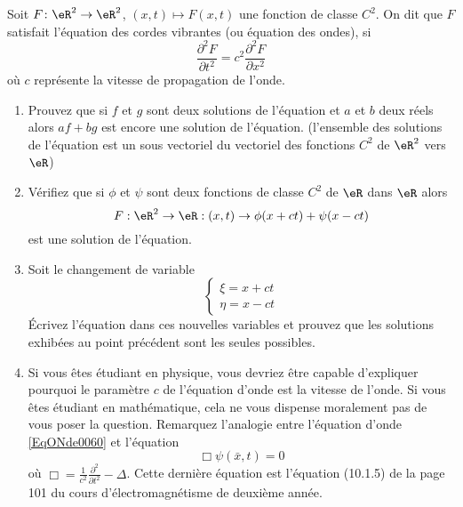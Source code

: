 
\begin{exercice}\label{exo0060}

Soit $F\colon \eR^2\to \eR^2$,  $(x,t) \mapsto F(x,t)$ une fonction de classe $C^2$. On dit que $F$ satisfait l'équation des cordes vibrantes (ou équation des ondes), si 
\begin{equation}		\label{EqONde0060}
	\frac{\partial^2 F}{\partial t^2 } = c^2 \frac{\partial^2 F}{\partial x^2}
\end{equation}
 où $c$ représente la vitesse de propagation de l'onde.

\begin{enumerate}
\item
Prouvez que si $f$ et $g$ sont deux solutions de l'équation et $a$ et $b$ deux réels alors $af+bg$ est  encore une solution de l'équation.  (l'ensemble des solutions de l'équation est un sous vectoriel du vectoriel des fonctions $C^2$ de $\eR^2$ vers $\eR$)
\item

Vérifiez que si $\phi$ et $\psi$ sont deux fonctions de classe $C^2$ de
$\eR$ dans $\eR$ alors
\[
F: \eR^2 \rightarrow \eR: (x,t) \rightarrow \phi(x+ct) + \psi(x-ct)
\]
est une solution de l'équation.
\item
Soit le changement de variable
\[
\left\{ \begin{array}{l} \xi = x + c t \\ \eta = x-ct \end{array} \right.
\]
Écrivez l'équation dans ces nouvelles variables et prouvez que les solutions exhibées au point précédent sont les seules possibles.

\item
Si vous êtes étudiant en physique, vous devriez être capable d'expliquer pourquoi le paramètre $c$ de l'équation d'onde est la vitesse de l'onde. Si vous êtes étudiant en mathématique, cela ne vous dispense moralement pas de vous poser la question. Remarquez l'analogie entre l'équation d'onde \eqref{EqONde0060} et l'équation 
\begin{equation}
	\Box \psi(\bar x,t)=0
\end{equation}
où $\Box =\frac{1}{ c^2 }\frac{ \partial^2 }{ \partial t^2 }-\Delta$. Cette dernière équation est l'équation (10.1.5) de la page 101 du cours d'électromagnétisme de deuxième année\cite{Schomblond_em}.

\end{enumerate}


\end{exercice}
